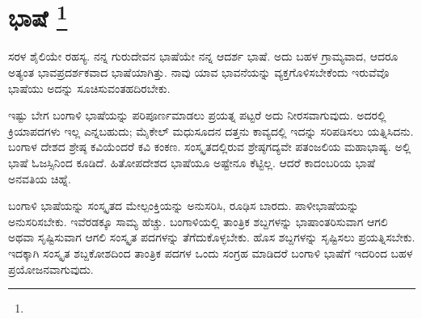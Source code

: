 
\chapter[ಭಾಷೆ ]{ಭಾಷೆ \protect\footnote{}}

ಸರಳ ಶೈಲಿಯೇ ರಹಸ್ಯ. ನನ್ನ ಗುರುದೇವನ ಭಾಷೆಯೇ ನನ್ನ ಆದರ್ಶ ಭಾಷೆ. ಅದು ಬಹಳ ಗ್ರಾಮ್ಯವಾದ, ಆದರೂ ಅತ್ಯಂತ ಭಾವಪ್ರದರ್ಶಕವಾದ ಭಾಷೆಯಾಗಿತ್ತು. ನಾವು ಯಾವ ಭಾವನೆಯನ್ನು ವ್ಯಕ್ತಗೊಳಿಸಬೇಕೆಂದು ಇರುವೆವೊ ಭಾಷೆಯು ಅದನ್ನು ಸೂಚಿಸುವಂತಹದಿರಬೇಕು.

ಇಷ್ಟು ಬೇಗ ಬಂಗಾಳಿ ಭಾಷೆಯನ್ನು ಪರಿಪೂರ್ಣಮಾಡಲು ಪ್ರಯತ್ನ ಪಟ್ಟರೆ ಅದು ನೀರಸವಾಗುವುದು. ಅದರಲ್ಲಿ ಕ್ರಿಯಾಪದಗಳು ಇಲ್ಲ ಎನ್ನಬಹುದು; ಮೈಕೇಲ್​ ಮಧುಸೂದನ ದತ್ತನು ಕಾವ್ಯದಲ್ಲಿ ಇದನ್ನು ಸರಿಪಡಿಸಲು ಯತ್ನಿಸಿದನು. ಬಂಗಾಳ ದೇಶದ ಶ್ರೇಷ್ಠ ಕವಿಯೆಂದರೆ ಕವಿ ಕಂಕಣ. ಸಂಸ್ಕೃತದಲ್ಲಿರುವ ಶ್ರೇಷ್ಠಗದ್ಯವೇ ಪತಂಜಲಿಯ ಮಹಾಭಾಷ್ಯ. ಅಲ್ಲಿ ಭಾಷೆ ಓಜಸ್ಸಿನಿಂದ ಕೂಡಿದೆ. ಹಿತೋಪದೇಶದ ಭಾಷೆಯೂ ಅಷ್ಟೇನೂ ಕೆಟ್ಟಿಲ್ಲ. ಆದರೆ ಕಾದಂಬರಿಯ ಭಾಷೆ ಅನವತಿಯ ಚಿಹ್ನೆ.

ಬಂಗಾಳಿ ಭಾಷೆಯನ್ನು ಸಂಸ್ಕೃತದ ಮೇಲ್ಪಂಕ್ತಿಯನ್ನು ಅನುಸರಿಸಿ, ರೂಢಿಸ ಬಾರದು. ಪಾಳೀಭಾಷೆಯನ್ನು ಅನುಸರಿಸಬೇಕು. ಇವೆರಡಕ್ಕೂ ಸಾಮ್ಯ ಹೆಚ್ಚು. ಬಂಗಾಳಿಯಲ್ಲಿ ತಾಂತ್ರಿಕ ಶಬ್ದಗಳನ್ನು ಭಾಷಾಂತರಿಸುವಾಗ ಆಗಲಿ ಅಥವಾ ಸೃಷ್ಟಿಸುವಾಗ ಆಗಲಿ ಸಂಸ್ಕೃತ ಪದಗಳನ್ನು ತೆಗೆದುಕೊಳ್ಳಬೇಕು. ಹೊಸ ಶಬ್ದಗಳನ್ನು ಸೃಷ್ಟಿಸಲು ಪ್ರಯತ್ನಿಸಬೇಕು. ಇದಕ್ಕಾಗಿ ಸಂಸ್ಕೃತ ಶಬ್ದಕೋಶದಿಂದ ತಾಂತ್ರಿಕ ಪದಗಳ ಒಂದು ಸಂಗ್ರಹ ಮಾಡಿದರೆ ಬಂಗಾಳಿ ಭಾಷೆಗೆ ಇದರಿಂದ ಬಹಳ ಪ್ರಯೋಜನವಾಗುವುದು.

